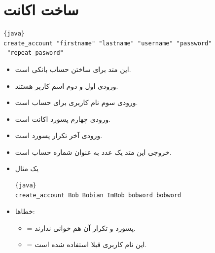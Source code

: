 \documentclass[]{article}
\begin{document}
\section*{{\titr ساخت اکانت}}


\begin{latin}

\begin{lstlisting}{java}
create_account "firstname" "lastname" "username" "password"
 "repeat_pasword"
\end{lstlisting}

\end{latin}


\begin{itemize}
\item
این متد برای ساختن حساب بانکی است.

\item
\textcolor{CustomColor}{ورودی}
 اول و دوم اسم کاربر هستند.

\item
\textcolor{CustomColor}{ورودی} سوم نام کاربری برای حساب است.

\item
\textcolor{CustomColor}{ورودی} چهارم پسورد اکانت است.

\item
\textcolor{CustomColor}{ورودی} آخر تکرار پسورد است.

\item
\textcolor{CustomColor}{خروجی} این متد یک عدد به عنوان شماره حساب است.

\item
\textcolor{CustomColor}{یک مثال}

\begin{latin}

\begin{lstlisting}{java}
create_account Bob Bobian ImBob bobword bobword
\end{lstlisting}

\end{latin}

\item
\textcolor{CustomColor}{خطاها}:

\begin{itemize}

\item
{} = پسورد و تکرار آن هم خوانی ندارند.

\item
{} = این نام کاربری قبلا استفاده شده است.

\end{itemize}


\end{itemize}
\end{document}
